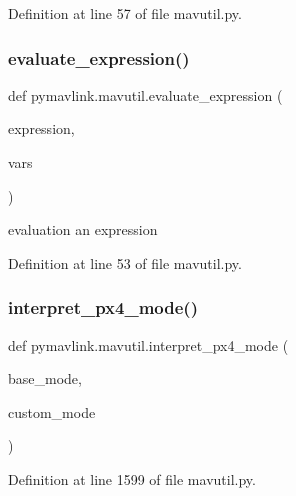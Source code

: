 Definition at line 57 of file mavutil.\+py.

\mbox{\label{namespacepymavlink_1_1mavutil_a59db6edd846450994bc53aabfeafff08}} 
\subsubsection{\texorpdfstring{evaluate\_expression()}{evaluate\_expression()}}
{\footnotesize\ttfamily def pymavlink.\+mavutil.\+evaluate\+\_\+expression (\begin{DoxyParamCaption}\item[{}]{expression,  }\item[{}]{vars }\end{DoxyParamCaption})}

\begin{DoxyVerb}evaluation an expression\end{DoxyVerb}
 

Definition at line 53 of file mavutil.\+py.

\mbox{\label{namespacepymavlink_1_1mavutil_af62b6a5d02a3c22bf1ee7913d8679939}} 
\subsubsection{\texorpdfstring{interpret\_px4\_mode()}{interpret\_px4\_mode()}}
{\footnotesize\ttfamily def pymavlink.\+mavutil.\+interpret\+\_\+px4\+\_\+mode (\begin{DoxyParamCaption}\item[{}]{base\+\_\+mode,  }\item[{}]{custom\+\_\+mode }\end{DoxyParamCaption})}



Definition at line 1599 of file mavutil.\+py.

\mbox{\label{namespacepymavlink_1_1mavutil_ae8d15d242baf89755d968c50f6f300b1}} 
